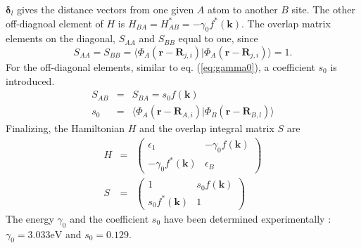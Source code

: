 $\bm{\delta}_l$ gives the distance vectors from one given $A$ atom to another $B$ site. The other off-diagnoal element of $H$ is $H_{B A} = H_{A B}^* = - \gamma_0 f^* \left( \mathbf{k} \right)$. The overlap matrix elements on the diagonal, $S_{A A}$ and $S_{B B}$ equal to one, since 
\begin{equation}
S_{A A} = S_{B B} = \langle \Phi_A ( \mathbf{r} - \mathbf{R}_{j, i} ) | \Phi_A ( \mathbf{r} - \mathbf{R}_{j, i} ) \rangle = 1.
\end{equation}
For the off-diagonal elements, similar to eq. (\ref{eq:gamma0}), a coefficient $s_0$ is introduced.
\begin{eqnarray}
S_{A B} &=& S_{B A} = s_0 f \left( \mathbf{k} \right) \\
s_0 &=& \langle \Phi_A ( \mathbf{r} - \mathbf{R}_{A, i} ) | \Phi_B ( \mathbf{r} - \mathbf{R}_{B, l} ) \rangle 
\end{eqnarray}
Finalizing, the Hamiltonian $H$ and the overlap integral matrix $S$ are
\begin{eqnarray}
H &=& \begin{pmatrix} \epsilon_1 & - \gamma_0 f \left( \mathbf{k} \right) \\ - \gamma_0 f^* \left( \mathbf{k} \right) & \epsilon_B \end{pmatrix} \\
S &=& \begin{pmatrix} 1 & s_0 f \left( \mathbf{k} \right) \\ s_0 f^* \left( \mathbf{k} \right) & 1 \end{pmatrix}
\end{eqnarray}
The energy $\gamma_0$ and the coefficient $s_0$ have been determined experimentally \cite{Dresselhaus1995}:
$\gamma_0 = 3.033 \text{eV}$ and $s_0 = 0.129$.

